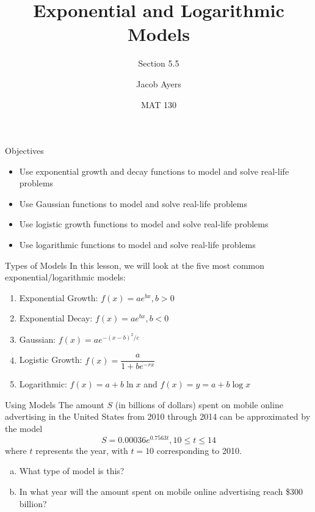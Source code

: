 \documentclass[t, aspectratio=169]{beamer}
\title[5.5]{Exponential and Logarithmic Models}
\subtitle{Section 5.5}
\author{Jacob Ayers}
\institute{Lesson \#21}
\date{MAT 130}
\begin{document}
	
	\begin{frame}
		\titlepage
	\end{frame}
	
	\begin{frame}{Objectives}
		\begin{itemize}
			\item Use exponential growth and decay functions to model and solve real-life problems
			\item Use Gaussian functions to model and solve real-life problems
			\item Use logistic growth functions to model and solve real-life problems
			\item Use logarithmic functions to model and solve real-life problems
		\end{itemize}
	\end{frame}

	\begin{frame}{Types of Models}
		In this lesson, we will look at the five most common exponential/logarithmic models: \begin{enumerate}[1)]
			\item<2-> Exponential Growth: $f(x) = ae^{bx}, b > 0$
			\item<3-> Exponential Decay: $f(x) = ae^{bx}, b < 0$
			\item<4-> Gaussian: $f(x) = ae^{-(x - b)^2 / c}$
			\item<5-> Logistic Growth: $f(x) = \dfrac{a}{1 + be^{-rx}}$
			\item<6-> Logarithmic: $f(x) = a + b \ln x$ and $f(x) = y = a + b \log x$
		\end{enumerate}
	\end{frame}

	\begin{frame}{Using Models}
		The amount $S$ (in billions of dollars) spent on mobile online advertising in the United States from 2010 through 2014 can be approximated by the model $$S = 0.00036e^{0.7563t}, 10\leq t \leq 14$$ where $t$ represents the year, with $t = 10$ corresponding to 2010. \begin{enumerate}[a)]
			\item What type of model is this?
			\item In what year will the amount spent on mobile online advertising reach \$300 billion?
		\end{enumerate}
	\end{frame}
\end{document}
